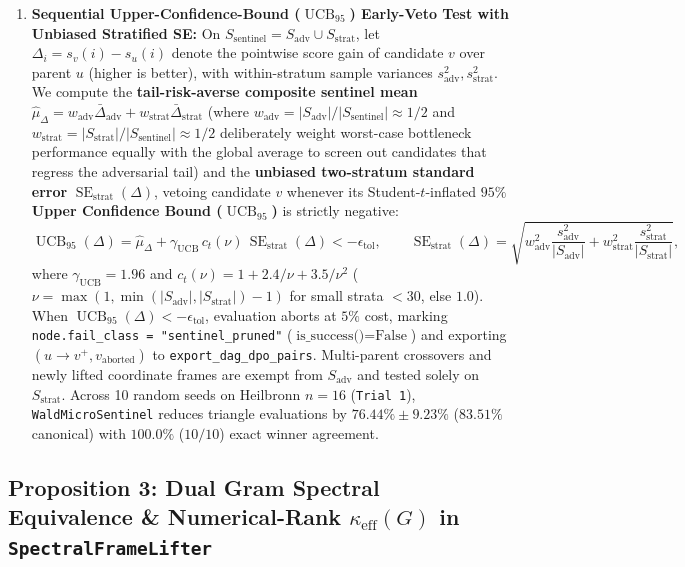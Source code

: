 \documentclass[11pt,a4paper]{article}
\begin{document}
\begin{enumerate}
\item \textbf{Sequential Upper-Confidence-Bound ($\operatorname{UCB}_{95}$) Early-Veto Test with Unbiased Stratified SE:} On $S_{\text{sentinel}} = S_{\text{adv}} \cup S_{\text{strat}}$, let $\Delta_i = s_v(i) - s_u(i)$ denote the pointwise score gain of candidate $v$ over parent $u$ (higher is better), with within-stratum sample variances $s_{\text{adv}}^2, s_{\text{strat}}^2$. We compute the \textbf{tail-risk-averse composite sentinel mean} $\hat{\mu}_\Delta = w_{\text{adv}}\bar{\Delta}_{\text{adv}} + w_{\text{strat}}\bar{\Delta}_{\text{strat}}$ (where $w_{\text{adv}} = |S_{\text{adv}}|/|S_{\text{sentinel}}| \approx 1/2$ and $w_{\text{strat}} = |S_{\text{strat}}|/|S_{\text{sentinel}}| \approx 1/2$ deliberately weight worst-case bottleneck performance equally with the global average to screen out candidates that regress the adversarial tail) and the \textbf{unbiased two-stratum standard error} $\operatorname{SE}_{\text{strat}}(\Delta)$, vetoing candidate $v$ whenever its Student-$t$-inflated $95\%$ \textbf{Upper Confidence Bound ($\operatorname{UCB}_{95}$)} is strictly negative:
\begin{equation}
\operatorname{UCB}_{95}(\Delta) = \hat{\mu}_\Delta + \gamma_{\text{UCB}}\,c_t(\nu)\,\operatorname{SE}_{\text{strat}}(\Delta) < -\epsilon_{\text{tol}}, \qquad \operatorname{SE}_{\text{strat}}(\Delta) = \sqrt{w_{\text{adv}}^2 \frac{s_{\text{adv}}^2}{|S_{\text{adv}}|} + w_{\text{strat}}^2 \frac{s_{\text{strat}}^2}{|S_{\text{strat}}|}},
\tag{10}\label{eq:ucb95_sentinel}
\end{equation}
where $\gamma_{\text{UCB}} = 1.96$ and $c_t(\nu) = 1 + 2.4/\nu + 3.5/\nu^2$ ($\nu = \max(1, \min(|S_{\text{adv}}|, |S_{\text{strat}}|) - 1)$ for small strata $< 30$, else $1.0$). When $\operatorname{UCB}_{95}(\Delta) < -\epsilon_{\text{tol}}$, evaluation aborts at $5\%$ cost, marking \texttt{node.fail\_class = "sentinel\_pruned"} ($\text{is\_success()} = \text{False}$) and exporting $(u \to v^+, v_{\text{aborted}})$ to \texttt{export\_dag\_dpo\_pairs}. Multi-parent crossovers and newly lifted coordinate frames are exempt from $S_{\text{adv}}$ and tested solely on $S_{\text{strat}}$. Across 10 random seeds on Heilbronn $n=16$ (\texttt{Trial 1}), \texttt{WaldMicroSentinel} reduces triangle evaluations by $\mathbf{76.44\% \pm 9.23\%}$ ($83.51\%$ canonical) with $\mathbf{100.0\%}$ ($10/10$) exact winner agreement.
\end{enumerate}

\subsection{Proposition 3: Dual Gram Spectral Equivalence \& Numerical-Rank $\kappa_{\text{eff}}(G)$ in \texttt{SpectralFrameLifter}}
\end{document}
